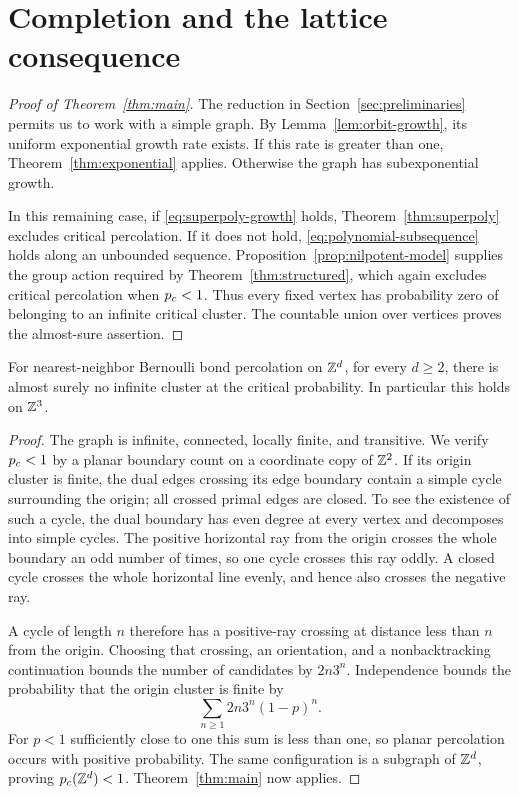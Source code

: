 \section{Completion and the lattice consequence}
\label{sec:completion}

\begin{proof}[Proof of Theorem~\ref{thm:main}]
The reduction in Section~\ref{sec:preliminaries} permits us to work
with a simple graph. By Lemma~\ref{lem:orbit-growth}, its uniform
exponential growth rate exists. If this rate is greater than one,
Theorem~\ref{thm:exponential} applies. Otherwise the graph has
subexponential growth.

In this remaining case, if \eqref{eq:superpoly-growth} holds,
Theorem~\ref{thm:superpoly} excludes critical percolation. If it does
not hold, \eqref{eq:polynomial-subsequence} holds along an unbounded
sequence. Proposition~\ref{prop:nilpotent-model} supplies the group
action required by Theorem~\ref{thm:structured}, which again excludes
critical percolation when $p_c<1$. Thus every fixed vertex has
probability zero of belonging to an infinite critical cluster.
The countable union over vertices proves the almost-sure assertion.
\end{proof}

\begin{corollary}
\label{cor:lattices}
For nearest-neighbor Bernoulli bond percolation on $\mathbb Z^d$, for every
$d\ge2$, there is almost surely no infinite cluster at the critical
probability. In particular this holds on $\mathbb Z^3$.
\end{corollary}

\begin{proof}
The graph is infinite, connected, locally finite, and transitive.
We verify $p_c<1$ by a planar boundary count on a coordinate copy
of $\mathbb Z^2$. If its origin cluster is finite, the dual edges crossing
its edge boundary contain a simple cycle surrounding the origin;
all crossed primal edges are closed. To see the existence of such
a cycle, the dual boundary has even degree at every vertex and
decomposes into simple cycles. The positive horizontal ray from
the origin crosses the whole boundary an odd number of times, so
one cycle crosses this ray oddly. A closed cycle crosses the whole
horizontal line evenly, and hence also crosses the negative ray.

A cycle of length $n$ therefore has a positive-ray crossing at
distance less than $n$ from the origin. Choosing that crossing,
an orientation, and a nonbacktracking continuation bounds the
number of candidates by $2n3^n$. Independence bounds the probability
that the origin cluster is finite by
\[
 \sum_{n\ge1}2n3^n(1-p)^n.
\]
For $p<1$ sufficiently close to one this sum is less than one,
so planar percolation occurs with positive probability. The same
configuration is a subgraph of $\mathbb Z^d$, proving $p_c(\mathbb Z^d)<1$.
Theorem~\ref{thm:main} now applies.
\end{proof}
